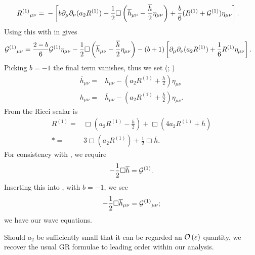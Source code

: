 \begin{align}
{R^{(1)}}_{\mu\nu} = {} & -\left[b \partial_\mu\partial_\nu(a_2  R^{(1)}) + \frac{1}{2}\Box\left(\overline{h}_{\mu\nu} -\frac{\overline{h}}{2}\eta_{\mu\nu}\right) + \frac{b}{6}(R^{(1)} + \mathcal{G}^{(1)})\eta_{\mu\nu}\right].
\label{eq:new_Ricci}
\end{align}
Using this with  in  gives
\begin{align}
{\mathcal{G}^{(1)}}_{\mu\nu} = {} & \frac{2 - b}{6}\mathcal{G}^{(1)}\eta_{\mu\nu} -\frac{1}{2}\Box\left(\overline{h}_{\mu\nu} - \frac{\overline{h}}{2}\eta_{\mu\nu}\right) - (b + 1)\left[\partial_\mu\partial_\nu(a_2 R^{(1)}) + \frac{1}{6}R^{(1)}\eta_{\mu\nu}\right].
\label{eq:b_Field}
\end{align}
Picking $b = -1$ the final term vanishes, thus we set (\citealt[section 10.3]{Will1993}; \citealt{Corda2008, Capozziello2008}) %
\begin{subequations}
\begin{align}
\label{eq:hbar_metric}
\overline{h}_{\mu\nu} = {} & h_{\mu\nu} - \left(a_2 R^{(1)} + \frac{h}{2}\right)\eta_{\mu\nu}\\
h_{\mu\nu} = {} & \overline{h}_{\mu\nu} - \left(a_2 R^{(1)} + \frac{\overline{h}}{2}\right)\eta_{\mu\nu}.
\label{eq:h_metric}
\end{align}
\end{subequations}
From  the Ricci scalar is 
\begin{align}
R^{(1)} = {} & \Box \left(a_2 R^{(1)} -\frac{\overline{h}}{2}\right) + \Box (4 a_2 R^{(1)} + \overline{h}) \nonumber \\*
 = {} & 3 \Box(a_2 R^{(1)}) + \frac{1}{2}\Box \overline{h}.
\label{eq:Ricci_Box_h}
\end{align}
For consistency with , we require
\begin{equation}
-\frac{1}{2}\Box \overline{h} = \mathcal{G}^{(1)}.
\label{eq:Box_h}
\end{equation}
Inserting this into , with $b = -1$, we see
\begin{equation}
-\frac{1}{2}\Box \overline{h}_{\mu\nu} = {\mathcal{G}^{(1)}}_{\mu\nu};
\label{eq:Box_hmunu}
\end{equation}
we have our wave equations.

Should $a_2$ be sufficiently small that it can be regarded an $\mathcal{O}\left({\varepsilon}\right)$ quantity, we recover the usual GR formulae to leading order within our analysis.

